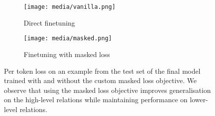 \begin{figure}[t]
    \centering
    \begin{subfigure}[c]{\textwidth}
        \centering
        \texttt{[image: media/vanilla.png]}
        \caption{Direct finetuning}
    \end{subfigure}%
    \hfill
    \begin{subfigure}[c]{\textwidth}
        \centering
        \texttt{[image: media/masked.png]}
        \caption{Finetuning with masked loss}
    \end{subfigure}%
    \caption{Per token loss on an example from the test set of the final model trained with and without the custom masked loss objective. We observe that using the masked loss objective improves generalisation on the high-level relations while maintaining performance on lower-level relations.}
    \label{fig:vanilla-vs-mask}
\end{figure}